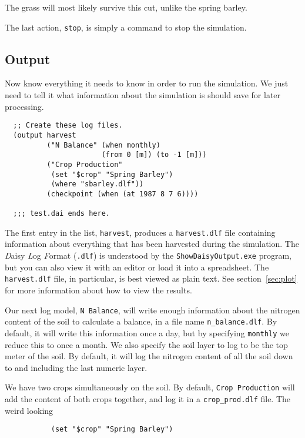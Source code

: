 \documentclass[a4paper,11pt]{article}
\begin{document}
The grass will most likely survive this cut, unlike the spring barley.

The last action, \texttt{stop}, is simply a command to stop the
simulation.

\subsection{Output}
\label{ex:output}

Now \daisy{} know everything it needs to know in order to run the
simulation.  We just need to tell it what information about the
simulation is should save for later processing.

\begin{verbatim}
  ;; Create these log files.
  (output harvest
          ("N Balance" (when monthly)
                       (from 0 [m]) (to -1 [m]))
          ("Crop Production"
           (set "$crop" "Spring Barley")
           (where "sbarley.dlf"))
          (checkpoint (when (at 1987 8 7 6))))

  ;;; test.dai ends here.
\end{verbatim}

The first entry in the list, \texttt{harvest}, produces a
\texttt{harvest.dlf} file containing information about everything that
has been harvested during the simulation.  The \emph{D}aisy \emph{L}og
\emph{F}ormat (\texttt{.dlf}) is understood by the
\texttt{ShowDaisyOutput.exe} program, but you can also view it with an
editor or load it into a spreadsheet.  The \texttt{harvest.dlf} file,
in particular, is best viewed as plain text.  See
section~\ref{sec:plot} for more information about how to view the results.

Our next log model, \texttt{N~Balance}, will write enough information
about the nitrogen content of the soil to calculate a balance, in a
file name \texttt{n\_balance.dlf}.  By default, it will write this
information once a day, but by specifying \texttt{monthly} we reduce
this to once a month.  We also specify the soil layer to log to be the
top meter of the soil.  By default, it will log the nitrogen content
of all the soil down to and including the last numeric layer.

We have two crops simultaneously on the soil.  By default,
\texttt{Crop~Production} will add the content of both crops together,
and log it in a \texttt{crop\_prod.dlf} file.  The weird looking

\begin{verbatim}
           (set "$crop" "Spring Barley")
\end{verbatim}%
\end{document}

